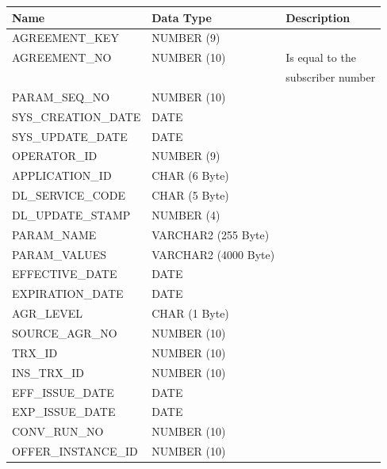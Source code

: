 \documentclass[12pt,twoside]{article}
\begin{document}
\begin{center}
\begin{tabular}{lll}
\hline
 Name                 &  Data Type             &  Description        \\
\hline
 AGREEMENT\_KEY       &  NUMBER (9)            &                     \\
 AGREEMENT\_NO        &  NUMBER (10)           &  Is equal to the    \\
                      &                        &  subscriber number  \\
 PARAM\_SEQ\_NO       &  NUMBER (10)           &                     \\
 SYS\_CREATION\_DATE  &  DATE                  &                     \\
 SYS\_UPDATE\_DATE    &  DATE                  &                     \\
 OPERATOR\_ID         &  NUMBER (9)            &                     \\
 APPLICATION\_ID      &  CHAR (6 Byte)         &                     \\
 DL\_SERVICE\_CODE    &  CHAR (5 Byte)         &                     \\
 DL\_UPDATE\_STAMP    &  NUMBER (4)            &                     \\
 PARAM\_NAME          &  VARCHAR2 (255 Byte)   &                     \\
 PARAM\_VALUES        &  VARCHAR2 (4000 Byte)  &                     \\
 EFFECTIVE\_DATE      &  DATE                  &                     \\
 EXPIRATION\_DATE     &  DATE                  &                     \\
 AGR\_LEVEL           &  CHAR (1 Byte)         &                     \\
 SOURCE\_AGR\_NO      &  NUMBER (10)           &                     \\
 TRX\_ID              &  NUMBER (10)           &                     \\
 INS\_TRX\_ID         &  NUMBER (10)           &                     \\
 EFF\_ISSUE\_DATE     &  DATE                  &                     \\
 EXP\_ISSUE\_DATE     &  DATE                  &                     \\
 CONV\_RUN\_NO        &  NUMBER (10)           &                     \\
 OFFER\_INSTANCE\_ID  &  NUMBER (10)           &                     \\
\hline
\end{tabular}
\end{center}
\end{document}
